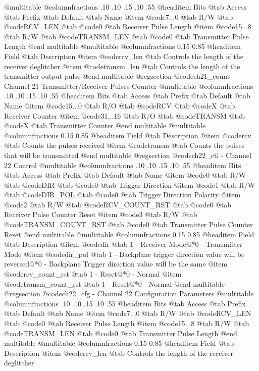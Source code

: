@multitable @columnfractions .10 .10 .15 .10 .55
@headitem Bits @tab Access @tab Prefix @tab Default @tab Name
@item @code{7...0}
@tab R/W @tab
@code{RCV_LEN}
@tab @code{0} @tab 
Receiver Pulse Length
@item @code{15...8}
@tab R/W @tab
@code{TRANSM_LEN}
@tab @code{0} @tab 
Transmitter Pulse Length
@end multitable
@multitable @columnfractions 0.15 0.85
@headitem Field @tab Description
@item @code{rcv_len} @tab Controls the length of the receiver deglitcher
@item @code{transm_len} @tab Controls the length of the transmitter output pulse
@end multitable
@regsection @code{ch21_count} - Channel 21 Transmitter/Receiver Pulses Counter
@multitable @columnfractions .10 .10 .15 .10 .55
@headitem Bits @tab Access @tab Prefix @tab Default @tab Name
@item @code{15...0}
@tab R/O @tab
@code{RCV}
@tab @code{X} @tab 
Receiver Counter
@item @code{31...16}
@tab R/O @tab
@code{TRANSM}
@tab @code{X} @tab 
Transmitter Counter
@end multitable
@multitable @columnfractions 0.15 0.85
@headitem Field @tab Description
@item @code{rcv} @tab Counts the pulses received
@item @code{transm} @tab Counts the pulses that will be transmitted
@end multitable
@regsection @code{ch22_ctl} - Channel 22 Control
@multitable @columnfractions .10 .10 .15 .10 .55
@headitem Bits @tab Access @tab Prefix @tab Default @tab Name
@item @code{0}
@tab R/W @tab
@code{DIR}
@tab @code{0} @tab 
Trigger Direction
@item @code{1}
@tab R/W @tab
@code{DIR_POL}
@tab @code{0} @tab 
Trigger Direction Polarity
@item @code{2}
@tab R/W @tab
@code{RCV_COUNT_RST}
@tab @code{0} @tab 
Receiver Pulse Counter Reset
@item @code{3}
@tab R/W @tab
@code{TRANSM_COUNT_RST}
@tab @code{0} @tab 
Transmitter Pulse Counter Reset
@end multitable
@multitable @columnfractions 0.15 0.85
@headitem Field @tab Description
@item @code{dir} @tab 1 - Receiver Mode@*0 - Transmitter Mode
@item @code{dir_pol} @tab 1 - Backplane trigger direction value will be reversed@*0 - Backplane Trigger direction value will be the same
@item @code{rcv_count_rst} @tab 1 - Reset@*0 - Normal
@item @code{transm_count_rst} @tab 1 - Reset@*0 - Normal
@end multitable
@regsection @code{ch22_cfg} - Channel 22 Configuration Parameters
@multitable @columnfractions .10 .10 .15 .10 .55
@headitem Bits @tab Access @tab Prefix @tab Default @tab Name
@item @code{7...0}
@tab R/W @tab
@code{RCV_LEN}
@tab @code{0} @tab 
Receiver Pulse Length
@item @code{15...8}
@tab R/W @tab
@code{TRANSM_LEN}
@tab @code{0} @tab 
Transmitter Pulse Length
@end multitable
@multitable @columnfractions 0.15 0.85
@headitem Field @tab Description
@item @code{rcv_len} @tab Controls the length of the receiver deglitcher
